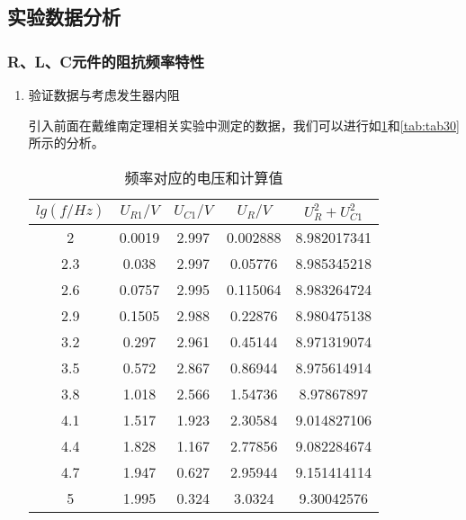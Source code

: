 \documentclass[dvipsnames, svgnames,a4paper,11pt]{article}
\begin{document}
	\subsection{实验数据分析}
	
	\subsubsection{R、L、C元件的阻抗频率特性}
	\begin{enumerate}
		\item 验证数据与考虑发生器内阻
		
		引入前面在戴维南定理相关实验中测定的数据，我们可以进行如\cref{tab:tab29}和\cref{tab:tab30}所示的分析。
		
		\begin{table}[h]
			\centering
			\caption{频率对应的电压和计算值}
			\label{tab:tab29}
			\begin{tabular}{|c|c|c|c|c|}
				\hline
				$lg(f/Hz)$ & $U_{R1}/V$ & $U_{C1}/V$ & $U_R/V$ & $U_R^2+U_{C1}^2$ \\
				\hline
				2 & 0.0019 & 2.997 & 0.002888 & 8.982017341 \\
				2.3 & 0.038 & 2.997 & 0.05776 & 8.985345218 \\
				2.6 & 0.0757 & 2.995 & 0.115064 & 8.983264724 \\
				2.9 & 0.1505 & 2.988 & 0.22876 & 8.980475138 \\
				3.2 & 0.297 & 2.961 & 0.45144 & 8.971319074 \\
				3.5 & 0.572 & 2.867 & 0.86944 & 8.975614914 \\
				3.8 & 1.018 & 2.566 & 1.54736 & 8.97867897 \\
				4.1 & 1.517 & 1.923 & 2.30584 & 9.014827106 \\
				4.4 & 1.828 & 1.167 & 2.77856 & 9.082284674 \\
				4.7 & 1.947 & 0.627 & 2.95944 & 9.151414114 \\
				5 & 1.995 & 0.324 & 3.0324 & 9.30042576 \\
				\hline
			\end{tabular}
		\end{table}
		

\end{enumerate}
\end{document}
